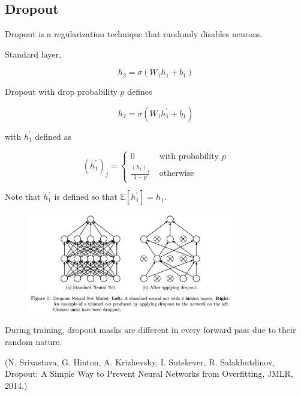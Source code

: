 \documentclass{report}
\begin{document}
\subsection{Dropout}

\begin{definition}[6.11][Dropout]
    Dropout is a regularization technique that randomly disables neurons.

    Standard layer,

    $$
    h_{2}=\sigma\left(W_{1} h_{1}+b_{1}\right)
    $$

    Dropout with drop probability $p$ defines

    $$
    h_{2}=\sigma\left(W_{1} h_{1}^{\prime}+b_{1}\right)
    $$

    with $h_{1}^{\prime}$ defined as

    $$
    \left(h_{1}^{\prime}\right)_{j}= \begin{cases}0 & \text { with probability } p \\ \frac{\left(h_{1}\right)_{j}}{1-p} & \text { otherwise }\end{cases}
    $$

    Note that $h_{1}^{\prime}$ is defined so that $\mathbb{E}[h_{1}^{\prime}]=h_1$.

    \begin{figure}[H]
        \centering
        \includegraphics[width=0.8\textwidth]{.././assets/6.6.png}
    \end{figure}

    During training, dropout masks are different in every forward pass due to their random nature.

    (N. Srivastava, G. Hinton, A. Krizhevsky, I. Sutskever, R. Salakhutdinov, Dropout: A Simple Way to Prevent Neural Networks from Overfitting, JMLR, 2014.)
\end{definition}
\end{document}
